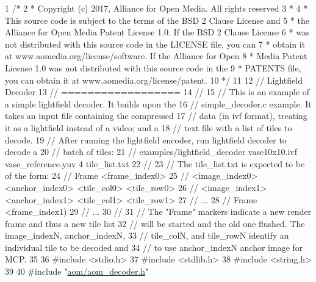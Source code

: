 \begin{DoxyCodeInclude}
1 \textcolor{comment}{/*}
2 \textcolor{comment}{ * Copyright (c) 2017, Alliance for Open Media. All rights reserved}
3 \textcolor{comment}{ *}
4 \textcolor{comment}{ * This source code is subject to the terms of the BSD 2 Clause License and}
5 \textcolor{comment}{ * the Alliance for Open Media Patent License 1.0. If the BSD 2 Clause License}
6 \textcolor{comment}{ * was not distributed with this source code in the LICENSE file, you can}
7 \textcolor{comment}{ * obtain it at www.aomedia.org/license/software. If the Alliance for Open}
8 \textcolor{comment}{ * Media Patent License 1.0 was not distributed with this source code in the}
9 \textcolor{comment}{ * PATENTS file, you can obtain it at www.aomedia.org/license/patent.}
10 \textcolor{comment}{ */}
11 
12 \textcolor{comment}{// Lightfield Decoder}
13 \textcolor{comment}{// ==================}
14 \textcolor{comment}{//}
15 \textcolor{comment}{// This is an example of a simple lightfield decoder. It builds upon the}
16 \textcolor{comment}{// simple\_decoder.c example.  It takes an input file containing the compressed}
17 \textcolor{comment}{// data (in ivf format), treating it as a lightfield instead of a video; and a}
18 \textcolor{comment}{// text file with a list of tiles to decode.}
19 \textcolor{comment}{// After running the lightfield encoder, run lightfield decoder to decode a}
20 \textcolor{comment}{// batch of tiles:}
21 \textcolor{comment}{// examples/lightfield\_decoder vase10x10.ivf vase\_reference.yuv 4 tile\_list.txt}
22 \textcolor{comment}{//}
23 \textcolor{comment}{// The tile\_list.txt is expected to be of the form:}
24 \textcolor{comment}{// Frame <frame\_index0>}
25 \textcolor{comment}{// <image\_index0> <anchor\_index0> <tile\_col0> <tile\_row0>}
26 \textcolor{comment}{// <image\_index1> <anchor\_index1> <tile\_col1> <tile\_row1>}
27 \textcolor{comment}{// ...}
28 \textcolor{comment}{// Frame <frame\_index1)}
29 \textcolor{comment}{// ...}
30 \textcolor{comment}{//}
31 \textcolor{comment}{// The "Frame" markers indicate a new render frame and thus a new tile list}
32 \textcolor{comment}{// will be started and the old one flushed.  The image\_indexN, anchor\_indexN,}
33 \textcolor{comment}{// tile\_colN, and tile\_rowN identify an individual tile to be decoded and}
34 \textcolor{comment}{// to use anchor\_indexN anchor image for MCP.}
35 
36 \textcolor{preprocessor}{#include <stdio.h>}
37 \textcolor{preprocessor}{#include <stdlib.h>}
38 \textcolor{preprocessor}{#include <string.h>}
39 
40 \textcolor{preprocessor}{#include "\hyperlink{aom__decoder_8h}{aom/aom\_decoder.h}"}

\end{DoxyCodeInclude}
